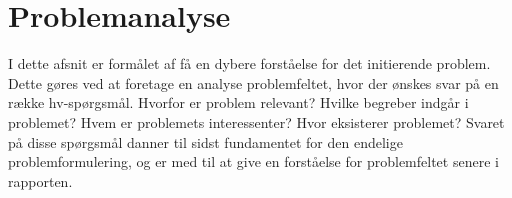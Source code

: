 \section{Problemanalyse}
I dette afsnit er formålet af få en dybere forståelse for det initierende problem. Dette gøres ved at foretage en analyse problemfeltet, hvor der ønskes svar på en række hv-spørgsmål. Hvorfor er problem relevant? Hvilke begreber indgår i problemet? Hvem er problemets interessenter? Hvor eksisterer problemet? Svaret på disse spørgsmål danner til sidst fundamentet for den endelige problemformulering, og er med til at give en forståelse for problemfeltet senere i rapporten.


\clearpage

\clearpage

\clearpage

\clearpage

\clearpage

